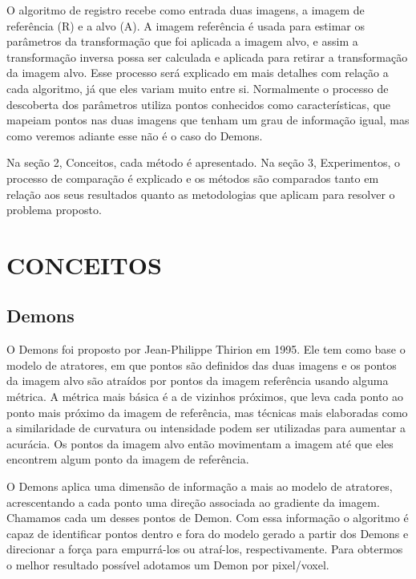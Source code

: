 \documentclass[]{spie}  %
\begin{document}
O algoritmo de registro recebe como entrada duas imagens, a imagem de referência (R) e a alvo (A). A imagem referência
é usada para estimar os parâmetros da transformação que foi aplicada a imagem alvo, e assim a transformação
inversa possa ser calculada e aplicada para retirar a transformação da imagem alvo. Esse processo será explicado
em mais detalhes com relação a cada algoritmo, já que eles variam muito entre si. Normalmente o processo de
descoberta dos parâmetros utiliza pontos conhecidos como características, que mapeiam pontos nas duas imagens que
tenham um grau de informação igual, mas como veremos adiante esse não é o caso do Demons.

Na seção 2, Conceitos, cada método é apresentado. Na seção 3, Experimentos, o processo de comparação é explicado e
os métodos são comparados tanto em relação aos seus resultados quanto as metodologias que aplicam para resolver o 
problema proposto.

\section{CONCEITOS} 

\subsection{Demons}
	O Demons foi proposto por Jean-Philippe Thirion em 1995. Ele tem como base o modelo de atratores, em que pontos são
definidos das duas imagens e os pontos da imagem alvo são atraídos por pontos da imagem referência usando alguma 
métrica. A métrica mais básica é a de vizinhos próximos, que leva cada ponto ao ponto mais próximo da imagem de 
referência, mas técnicas mais elaboradas como a similaridade de curvatura ou intensidade podem ser utilizadas para 
aumentar a acurácia. Os pontos da imagem alvo então movimentam a imagem até que eles encontrem algum ponto da imagem
de referência.

	O Demons aplica uma dimensão de informação a mais ao modelo de atratores, acrescentando a cada ponto uma direção
associada ao gradiente da imagem. Chamamos cada um desses pontos de Demon. Com essa informação o algoritmo é capaz
de identificar pontos dentro e fora do modelo gerado a partir dos Demons e direcionar a força para empurrá-los ou
atraí-los, respectivamente. Para obtermos o melhor resultado possível adotamos um Demon por pixel/voxel.
\end{document}
